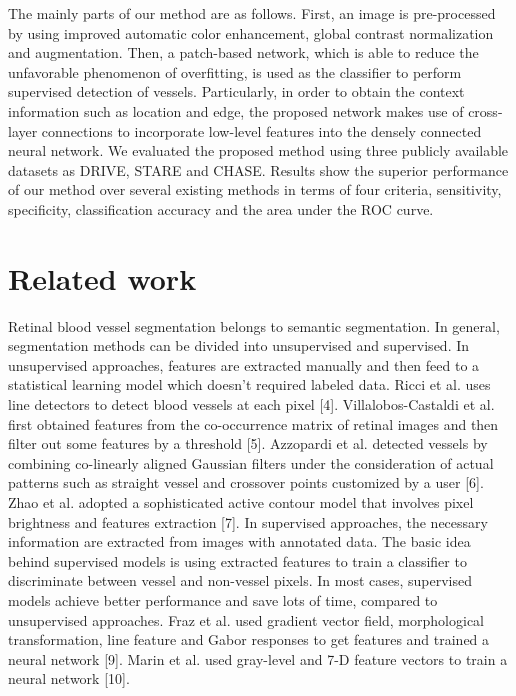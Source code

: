 \documentclass{article}
\begin{document}
The mainly parts of our method are as follows. First, an image is pre-processed by using improved automatic color enhancement, global contrast normalization and augmentation. Then, a patch-based network, which is able to reduce the unfavorable phenomenon of overfitting, is used as the classifier to perform supervised detection of vessels. Particularly, in order to obtain the context information such as location and edge, the proposed network makes use of cross-layer connections to incorporate low-level features into the densely connected neural network. We evaluated the proposed method using three publicly available datasets as DRIVE, STARE and CHASE. Results show the superior performance of our method over several existing methods in terms of four criteria, sensitivity, specificity, classification accuracy and the area under the ROC curve. 

\section{Related work}

Retinal blood vessel segmentation belongs to semantic segmentation. In general, segmentation methods can be divided into unsupervised and supervised. In unsupervised approaches, features are extracted manually and then feed to a statistical learning model which doesn’t required labeled data. Ricci et al. uses line detectors to detect blood vessels at each pixel [4]. Villalobos-Castaldi et al. first obtained features from the co-occurrence matrix of retinal images and then filter out some features by a threshold [5]. Azzopardi et al. detected vessels by combining co-linearly aligned Gaussian filters under the consideration of actual patterns such as straight vessel and crossover points customized by a user [6]. Zhao et al. adopted a sophisticated active contour model that involves pixel brightness and features extraction [7]. In supervised approaches, the necessary information are extracted from images with annotated data. The basic idea behind supervised models is using extracted features to train a classifier to discriminate between vessel and non-vessel pixels. In most cases, supervised models achieve better performance and save lots of time, compared to unsupervised approaches. Fraz et al. used gradient vector field, morphological transformation, line feature and Gabor responses to get features and trained a neural network [9]. Marin et al. used gray-level and 7-D feature vectors to train a neural network [10].
\end{document}
